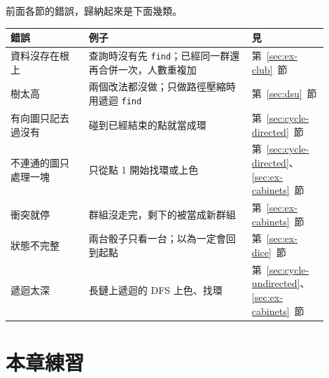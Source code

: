 前面各節的錯誤，歸納起來是下面幾類。

\begin{center}
\begin{tabular}{p{0.24\linewidth}p{0.5\linewidth}p{0.16\linewidth}}
\toprule
錯誤 & 例子 & 見 \\
\midrule
資料沒存在根上 & 查詢時沒有先 \texttt{find}；已經同一群還再合併一次，人數重複加 &
第~\ref{sec:ex-club}~節 \\
樹太高 & 兩個改法都沒做；只做路徑壓縮時用遞迴 \texttt{find} &
第~\ref{sec:dsu}~節 \\
有向圖只記去過沒有 & 碰到已經結束的點就當成環 & 第~\ref{sec:cycle-directed}~節 \\
不連通的圖只處理一塊 & 只從點 1 開始找環或上色 & 第~\ref{sec:cycle-directed}、
\ref{sec:ex-cabinets}~節 \\
衝突就停 & 群組沒走完，剩下的被當成新群組 & 第~\ref{sec:ex-cabinets}~節 \\
狀態不完整 & 兩台骰子只看一台；以為一定會回到起點 & 第~\ref{sec:ex-dice}~節 \\
遞迴太深 & 長鏈上遞迴的 DFS 上色、找環 & 第~\ref{sec:cycle-undirected}、
\ref{sec:ex-cabinets}~節 \\
\bottomrule
\end{tabular}
\end{center}

\section{本章練習}
\label{sec:ch19-exercises}

